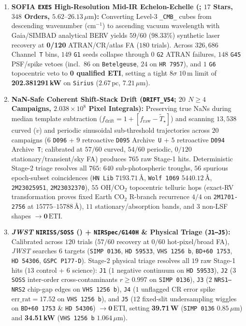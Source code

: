 \documentclass[twocolumn,10pt]{article}
\begin{document}
\begin{enumerate}
  \item \textbf{SOFIA \texttt{EXES} High-Resolution Mid-IR Echelon-Echelle (\cite{Richter2018}; $17$ Stars, $348$ Orders, $5.62\text{--}26.13\,\mu\text{m}$):} Converting Level-3 \texttt{\_CMB\_} cubes from descending wavenumber ($\mathrm{cm^{-1}}$) to ascending vacuum wavelength with Gaia/SIMBAD analytical BERV yields $59/60$ ($98.33\%$) synthetic laser recovery at \textbf{0/120} ATRAN/CR/atlas FA ($180$ trials). Across $326{,}686$ Channel~\texttt{T} bins, $149$ \texttt{G1} seeds collapse through $0$ \texttt{G2} ATRAN failures, $148$ \texttt{G45} PSF/spike vetoes (incl.\ $86$ on \texttt{Betelgeuse}, $24$ on \texttt{HR\,7957}), and $1$ \texttt{G6} topocentric veto to \textbf{0 qualified ETI}, setting a tight $8\sigma$ $10\,\text{m}$ limit of \textbf{202.381291\,kW} on \texttt{Sirius} ($2.67\,\text{pc}$, $7.21\,\mu\text{m}$).
  \item \textbf{NaN-Safe Coherent Shift-Stack Drift (\texttt{DRIFT\_V54}; $20$ $N\ge 4$ Campaigns, $2.038\times 10^8$ Pixel Integrals):} Preserving true NaNs during median template subtraction ($f_{\mathrm{drift}} = 1 + [f_{\mathrm{raw}} - \tilde{T}_\star]$) and scanning $13{,}538$ curved ($\ddot{v}$) and periodic sinusoidal sub-threshold trajectories across $20$ campaigns ($6$ \texttt{D096} + $9$ retroactive \texttt{D095} Archive~\texttt{U} + $5$ retroactive \texttt{D094} Archive~\texttt{T}; calibrated at $57/60$ curved, $54/60$ periodic, $0/120$ stationary/transient/sky FA) produces $765$ raw Stage-1 hits. Deterministic Stage-2 triage resolves all $765$: $640$ sub-photospheric troughs, $56$ spurious epoch-subset coincidences (\texttt{HN\,Lib} $7193.71\,\text{\AA}$, \texttt{Wolf\,1069} $5440.12\,\text{\AA}$, \texttt{2M23025951}, \texttt{2M23032370}), $55$ OH/CO$_2$ topocentric telluric hops (exact-RV transformation proves fixed Earth CO$_2$ R-branch recurrence $4/4$ on \texttt{2M1701-2756} at $15775\text{--}15788\,\text{\AA}$), $11$ stationary/absorption bands, and $3$ non-LSF shapes $\rightarrow \mathbf{0\,\mathrm{ETI}}$.
  \item \textbf{\textit{JWST} \texttt{NIRISS/SOSS} (\cite{Albert2023}) + \texttt{NIRSpec/G140H} \& Physical Triage (\texttt{J1--J5}):} Calibrated across $120$ trials ($57/60$ recovery at $0/60$ hot-pixel/broad FA), \textit{JWST} searches $6$ targets (\texttt{SIMP\,0136}, \texttt{HD\,59533}, \texttt{VHS\,1256\,b}, \texttt{BD+60\,1753}, \texttt{HD\,54306}, \texttt{GSPC\,P177-D}). Stage-2 physical triage resolves all $19$ raw Stage-1 hits ($13$ control + $6$ science): \texttt{J1} ($1$ negative continuum on \texttt{HD\,59533}), \texttt{J2} ($3$ \texttt{SOSS} inter-order cross-contaminants $r\ge 0.997$ on \texttt{SIMP\,0136}), \texttt{J3} ($2$ \texttt{NRS1--NRS2} chip-gap edges on \texttt{VHS\,1256\,b}), \texttt{J4} ($1$ unflagged CR error spike $\mathrm{err\_rat}=17.52$ on \texttt{VHS\,1256\,b}), and \texttt{J5} ($12$ fixed-slit undersampling wiggles on \texttt{BD+60\,1753} \& \texttt{HD\,54306}) $\rightarrow \mathbf{0\,\mathrm{ETI}}$, setting \textbf{39.71\,W} (\texttt{SIMP\,0136} $0.85\,\mu\text{m}$) and \textbf{34.51\,kW} (\texttt{VHS\,1256\,b} $1.064\,\mu\text{m}$).

\end{enumerate}
\end{document}
